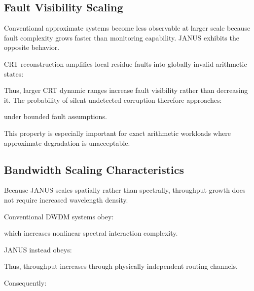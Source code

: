 \documentclass[journal]{IEEEtran}
\begin{document}
\subsection{\textbf{Fault Visibility Scaling}}

Conventional approximate systems become less observable at larger scale because fault complexity grows faster than monitoring capability.
JANUS exhibits the opposite behavior.

CRT reconstruction amplifies local residue faults into globally invalid arithmetic states:

\begin{center}
\end{center}

Thus, larger CRT dynamic ranges increase fault visibility rather than decreasing it. The probability of silent undetected corruption therefore
approaches:
\begin{center}
\end{center}

under bounded fault assumptions.

This property is especially important for exact arithmetic workloads where approximate degradation is unacceptable.

\subsection{\textbf{Bandwidth Scaling Characteristics}}

Because JANUS scales spatially rather than spectrally, throughput growth does not require increased wavelength density.

Conventional DWDM systems obey:
\begin{center}
\end{center}

which increases nonlinear spectral interaction complexity.

JANUS instead obeys:
\begin{center}
\end{center}

Thus, throughput increases through physically independent routing channels.

Consequently:
\begin{center}
\end{center}
\end{document}
